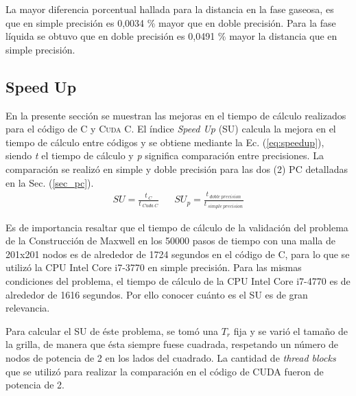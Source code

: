 
La mayor diferencia porcentual hallada para la distancia en la fase gaseosa, es que en simple precisión es 0,0034 \% mayor que en doble precisión. Para la fase líquida se obtuvo que en doble precisión es 0,0491 \% mayor la distancia que en simple precisión.


%

\newpage

\subsection{Speed Up}

En la presente sección se muestran las mejoras en el tiempo de cálculo realizados para el código de \textsc{C} y \textsc{Cuda C}. El índice \textit{Speed Up} (SU) calcula la mejora en el tiempo de cálculo entre códigos y se obtiene mediante la Ec. (\ref{eq:speedup}), siendo \textit{t} el tiempo de cálculo y \textit{p} significa comparación entre precisiones. La comparación se realizó en simple y doble precisión para las dos (2) PC detalladas en la Sec. (\ref{sec_pc}).
\begin{align}
	SU = \frac{t_{\>C}}{t_{\>Cuda \> C}} & & 	{SU}_p = \frac{t_{\>doble \> precision}}{t_{\>simple \> precision}} 
	\label{eq:speedup}
\end{align}

Es de importancia resaltar que el tiempo de cálculo de la validación del problema de la Construcción de Maxwell en los 50000 pasos de tiempo con una malla de 201x201 nodos es de alrededor de 1724 segundos en el código de \textsc{C}, para lo que se utilizó la CPU Intel Core i7-3770 en simple precisión. 
Para las mismas condiciones del problema, el tiempo de cálculo de la CPU Intel Core i7-4770 es de alrededor de 1616 segundos. Por ello conocer cuánto es el SU es de gran relevancia.

Para calcular el \textsc{SU} de éste problema, se tomó una $T_r$ fija y se varió el tamaño de la grilla, de manera que ésta siempre fuese cuadrada, respetando un número de nodos de potencia de 2 en los lados del cuadrado. La cantidad de \textit{thread blocks} que se utilizó para realizar la comparación en el código de \textsc{CUDA} fueron de potencia de 2.


